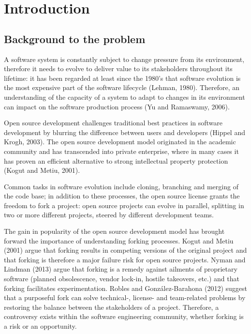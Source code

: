 
\chapter{Introduction} %

\label{Chapter1} %


\section{Background to the problem}
A software system is constantly subject to change pressure from its environment, therefore it needs to evolve to deliver value to its stakeholders throughout its lifetime: it has been regarded at least since the 1980's that software evolution is the most expensive part of the software lifecycle (Lehman, 1980). Therefore, an understanding of the capacity of a system to adapt to changes in its environment can impact on the software production process (Yu and Ramaswamy, 2006).

Open source development challenges traditional best practices in software development by blurring the difference between users and developers (Hippel and Krogh, 2003). The open source development model originated in the academic community and has transcended into private enterprise, where in many cases it has proven an efficient alternative to strong intellectual property protection (Kogut and Metiu, 2001).

Common tasks in software evolution include cloning, branching and merging of the code base; in addition to these processes, the open source license grants the freedom to fork a project: open source projects can evolve in parallel, splitting in two or more different projects, steered by different development teams.

The gain in popularity of the open source development model has brought forward the importance of understanding forking processes. Kogut and Metiu (2001) argue that forking results in competing versions of the original project and that forking is therefore a major failure risk for open source projects. Nyman and Lindman (2013) argue that forking is a remedy against ailments of proprietary software (planned obsolescence, vendor lock-in, hostile takeovers, etc.) and that forking facilitates experimentation. Robles and González-Barahona (2012) suggest that a purposeful fork can solve technical-, license- and team-related problems by restoring the balance between the stakeholders of a project. Therefore, a controversy exists within the software engineering community, whether forking is a risk or an opportunity.

